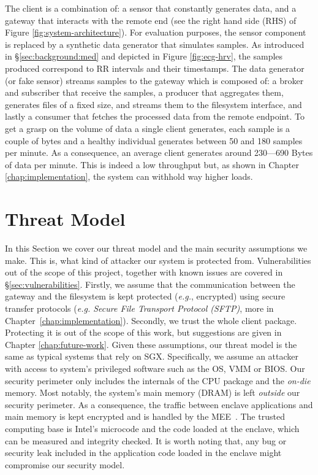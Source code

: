 The client is a combination of: a sensor that constantly generates data, and a gateway that interacts with the remote end (see the right hand side (RHS) of Figure \ref{fig:system-architecture}). 
For evaluation purposes, the sensor component is replaced by a synthetic data generator that simulates samples.
As introduced in \S\ref{sec:background:med} and depicted in Figure \ref{fig:ecg-hrv}, the samples produced correspond to RR intervals and their timestamps.
The data generator (or fake sensor) streams samples to the gateway which is composed of: a broker and subscriber that receive the samples, a producer that aggregates them, generates files of a fixed size, and streams them to the filesystem interface, and lastly a consumer that fetches the processed data from the remote endpoint. 
To get a grasp on the volume of data a single client generates, each sample is a couple of bytes and a healthy individual generates between 50 and 180 samples per minute.
As a consequence, an average client generates around 230---690 Bytes of data per minute.
This is indeed a low throughput but, as shown in Chapter \ref{chap:implementation}, the system can withhold way higher loads.

\section{Threat Model} \label{sec:threat}

In this Section we cover our threat model and the main security assumptions we make.
This is, what kind of attacker our system is protected from.
Vulnerabilities out of the scope of this project, together with known issues are covered in \S\ref{sec:vulnerabilities}.
Firstly, we assume that the communication between the gateway and the filesystem is kept protected (\emph{e.g.}, encrypted) using secure transfer protocols (\textit{e.g. Secure File Transport Protocol (SFTP)}, more in Chapter~\ref{chap:implementation}).
Secondly, we trust the whole client package.
Protecting it is out of the scope of this work, but suggestions are given in Chapter \ref{chap:future-work}.
Given these assumptions, our threat model is the same as typical systems that rely on \textsc{SGX}. 
Specifically, we assume an attacker with access to system's privileged software such as the OS, VMM or BIOS.
Our security perimeter only includes the internals of the CPU package and the \textit{on-die} memory.
Most notably, the system's main memory (DRAM) is left \emph{outside} our security perimeter.
As a consequence, the traffic between enclave applications and main memory is kept encrypted and is handled by the MEE~\cite{Gueron16}.
The trusted computing base is Intel's microcode and the code loaded at the enclave, which can be measured and integrity checked. 
It is worth noting that, any bug or security leak included in the application code loaded in the enclave might compromise our security model.

